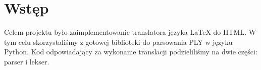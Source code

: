 \chapter{Wstęp}

Celem projektu było zaimplementowanie translatora języka LaTeX do HTML. W tym celu skorzystaliśmy z gotowej biblioteki do parsowania
PLY w języku Python. Kod odpowiadający za wykonanie translacji podzieliliśmy na dwie części: parser i lekser.